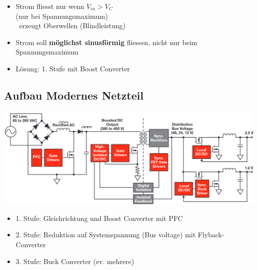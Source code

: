 \begin{minipage}[c]{0.48\columnwidth}
    \begin{center}
    \end{center}
    \begin{itemize}
        \item Strom fliesst nur wenn $V_{in} > V_C$\\
            (nur bei Spannungsmaximum) \\
            \textrightarrow\ erzeugt Oberwellen (Blindleistung)
    \end{itemize}
\end{minipage}
\hfill
\begin{minipage}[c]{0.48\columnwidth}
    \begin{center}
    \end{center}
    \begin{itemize}
        \item Strom soll \textbf{möglichst sinusförmig} fliessen, nicht nur beim Spannungsmaximum
        \item Lösung: 1. Stufe mit Boost Converter
    \end{itemize}
\end{minipage}


\subsection{Aufbau Modernes Netzteil}

\includegraphics[width=\columnwidth]{images/modernes_netzteil.png}

\begin{itemize}
    \item 1. Stufe: Gleichrichtung und Boost Converter mit PFC
    \item 2. Stufe: Reduktion auf Systemspannung (Bus voltage) mit Flyback-Converter
    \item 3. Stufe: Buck Converter (ev. mehrere)
\end{itemize}


